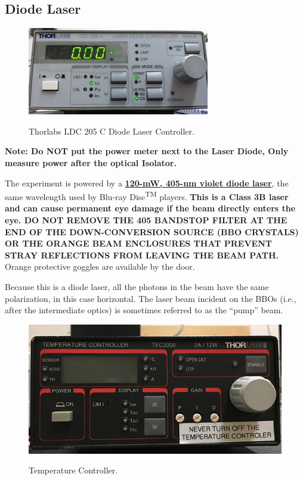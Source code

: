 \documentclass{../lab}
\begin{document}
\subsection{Diode Laser}

\begin{figure}[h]
    \centering
    \href{http://experimentationlab.berkeley.edu/sites/default/files/images/300px-QIE_LDController.jpg}{\includegraphics[width=0.5\linewidth]{images/300px-QIE_LDController.jpg}}
    \caption{Thorlabs LDC 205 C Diode Laser Controller.}
    \label{fig:300px-QIE_LDController}
\end{figure}

\textbf{Note: Do NOT put the power meter next to the Laser Diode, Only measure power after the optical Isolator.}

The experiment is powered by a \href{http://experimentationlab.berkeley.edu/sites/default/files/QIE/D405-120.pdf}{\textbf{120-mW, 405-nm violet diode laser}}, the same wavelength used by Blu-ray Disc\textsuperscript{TM} players. \textbf{This is a Class 3B laser and can cause permanent eye damage if the beam directly enters the eye. DO NOT REMOVE THE 405 BANDSTOP FILTER AT THE END OF THE DOWN-CONVERSION SOURCE (BBO CRYSTALS) OR THE ORANGE BEAM ENCLOSURES THAT PREVENT STRAY REFLECTIONS FROM LEAVING THE BEAM PATH.} Orange protective goggles are available by the door.

Because this is a diode laser, all the photons in the beam have the same polarization, in this case horizontal. The laser beam incident on the BBOs (i.e., after the intermediate optics) is sometimes referred to as the ``pump'' beam.

\begin{figure}[h]
    \centering
    \href{http://experimentationlab.berkeley.edu/sites/default/files/images/4032px-QIE_TempController.jpg}{\includegraphics[width=0.5\linewidth]{images/508px-QIE_TempController.jpg}}
    \caption{Temperature Controller.}
    \label{fig:508px-QIE_TempController}
\end{figure}
\end{document}
